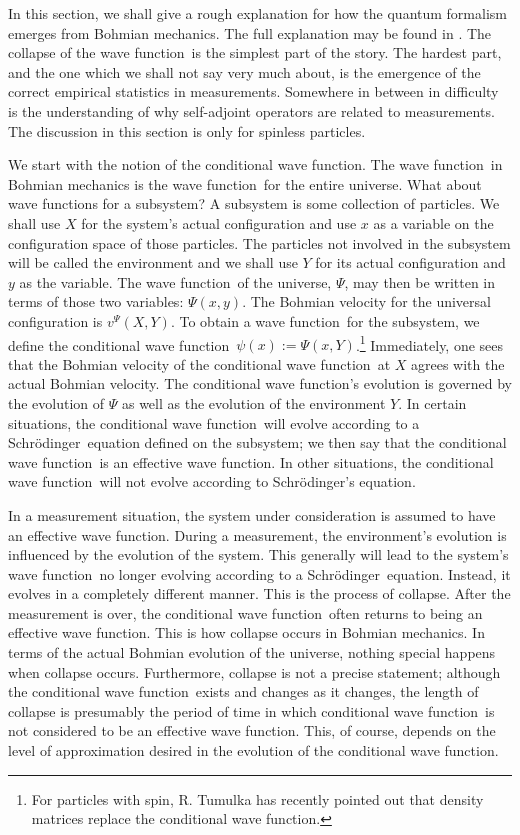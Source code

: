 \documentclass[11pt]{article}
\theoremstyle{remark}
\begin{document}
In this section, we shall give a rough explanation
for how the quantum formalism emerges
from Bohmian mechanics. The full explanation may be found in
\cite{DGZ92, DGZ03}.
The collapse of the wave function\ is the simplest part
of the story. The hardest part, and the one which we shall not say
very much about, is the emergence of the correct empirical statistics
in measurements. Somewhere in between in difficulty is the
understanding of why self-adjoint operators are related to
measurements. The discussion in this section is only for spinless
particles. 

We start with the notion of the conditional wave function. The wave function\ in Bohmian
mechanics is the wave function\ for the entire universe. What about wave functions for a
subsystem? A subsystem is some collection of particles. We shall use
$X$ for the system's actual configuration and use $x$ as a variable on
the configuration space of those particles. The particles not involved in
the subsystem will be called the environment and we shall use $Y$ for
its actual configuration and $y$ as the variable. The wave function\ of the
universe, $\Psi$, may then be written in terms of those two variables: 
$\Psi(x,y)$. The Bohmian velocity for the universal configuration is
$v^{\Psi} (X,Y)$. To obtain a wave function\ for the subsystem, we define the
conditional wave function\ $\ensuremath{\psi}(x) \ensuremath{:=} \Psi(x,Y)$.\footnote{For particles with
  spin, R. Tumulka has recently pointed out that density matrices
  replace the conditional wave function.} Immediately, one sees that
the Bohmian velocity of the conditional wave function\ at $X$ agrees with the
actual Bohmian velocity. The conditional wave function's evolution is governed
by the evolution of $\Psi$ as well as the evolution of the environment
$Y$. In certain situations, the conditional wave function\ will evolve according
to a Schr\"odinger\ equation defined on the subsystem; we then say that the
conditional wave function\ is an
effective wave function. In other situations, the
conditional wave function\ will not evolve according to Schr\"odinger's equation. 

In a
measurement situation, the system under consideration is assumed to
have an effective wave function.
 During a measurement, the
environment's evolution is influenced by the evolution of the
system. This generally will lead to the system's wave function\ no longer
evolving according to a Schr\"odinger\ equation. Instead, it evolves in a
completely different manner. This is the process of collapse. After
the measurement is over, the conditional wave function\ often returns to
being an effective wave function. This is how collapse occurs in Bohmian
mechanics. In terms of the actual Bohmian evolution of the universe,
nothing special happens when collapse occurs. Furthermore, collapse is
not a precise statement; although the conditional wave function\ exists and
changes as it changes, the length of collapse is presumably the
period of time in which conditional wave function\ is not
considered to be an effective wave function. This, of course, depends on the
level of approximation desired in the evolution of the conditional
wave function.  
\end{document}
